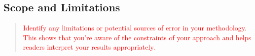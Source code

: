 
\subsection{Scope and Limitations}
\label{ssec:scope-limitations}
\begin{quote}\textcolor{red}{
    Identify any limitations or potential sources of error in your methodology. This shows that you're aware of the constraints of your approach and helps readers interpret your results appropriately.
}\end{quote}
